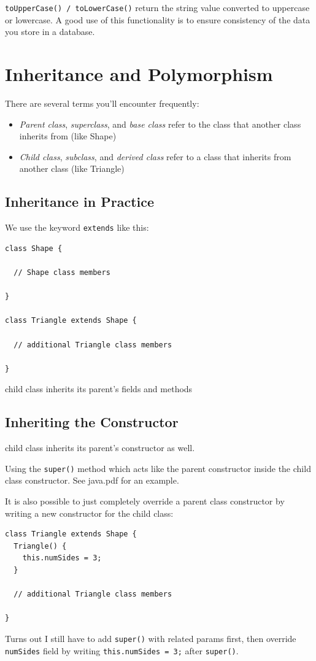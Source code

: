 \documentclass[a4paper, 12pt]{article}
\begin{document}
\verb|toUpperCase() / toLowerCase()| return the string value converted to uppercase or lowercase. A good use of this functionality is to ensure consistency of the data you store in a database.


\section{Inheritance and Polymorphism}
There are several terms you'll encounter frequently:
\begin{itemize}
\item \textit{Parent class}, \textit{superclass}, and \textit{base class} refer to the class that another class inherits from (like Shape)

\item \textit{Child class}, \textit{subclass}, and \textit{derived class} refer to a class that inherits from another class (like Triangle)

\end{itemize}

\subsection{Inheritance in Practice}
We use the keyword \verb|extends| like this:
\begin{verbatim}
class Shape {

  // Shape class members

}

class Triangle extends Shape {

  // additional Triangle class members

}
\end{verbatim}

child class inherits its parent's fields and methods

\subsection{Inheriting the Constructor}
child class inherits its parent's constructor as well. 

Using the \verb|super()| method which acts like the parent constructor inside the child class constructor. See java.pdf for an example.

It is also possible to just completely override a parent class constructor by writing a new constructor for the child class:
\begin{verbatim}
class Triangle extends Shape {
  Triangle() {
    this.numSides = 3;
  }

  // additional Triangle class members

}
\end{verbatim}
Turns out I still have to add \verb|super()| with related params first, then override \verb|numSides| field by writing \verb|this.numSides = 3;| after \verb|super()|.
\end{document}
